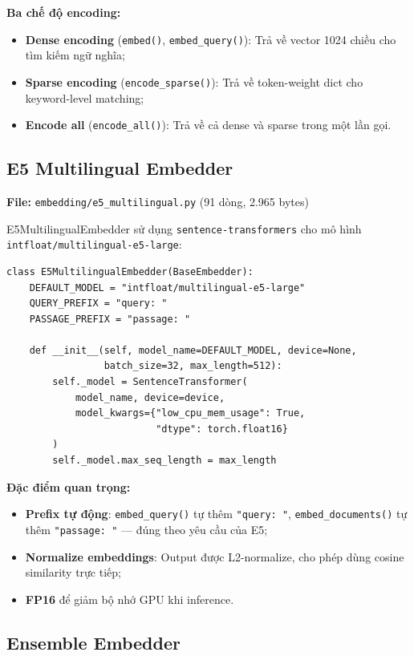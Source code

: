 \documentclass[../DoAn.tex]{subfiles}
\begin{document}
\textbf{Ba chế độ encoding:}
\begin{itemize}
    \item \textbf{Dense encoding} (\texttt{embed()}, \texttt{embed\_query()}): Trả về vector 1024 chiều cho tìm kiếm ngữ nghĩa;
    \item \textbf{Sparse encoding} (\texttt{encode\_sparse()}): Trả về token-weight dict cho keyword-level matching;
    \item \textbf{Encode all} (\texttt{encode\_all()}): Trả về cả dense và sparse trong một lần gọi.
\end{itemize}

\subsection{E5 Multilingual Embedder}
\textbf{File:} \texttt{embedding/e5\_multilingual.py} (91 dòng, 2.965 bytes)

E5MultilingualEmbedder sử dụng \texttt{sentence-transformers} cho mô hình \texttt{intfloat/multilingual-e5-large}:
\begin{verbatim}
class E5MultilingualEmbedder(BaseEmbedder):
    DEFAULT_MODEL = "intfloat/multilingual-e5-large"
    QUERY_PREFIX = "query: "
    PASSAGE_PREFIX = "passage: "

    def __init__(self, model_name=DEFAULT_MODEL, device=None,
                 batch_size=32, max_length=512):
        self._model = SentenceTransformer(
            model_name, device=device,
            model_kwargs={"low_cpu_mem_usage": True,
                          "dtype": torch.float16}
        )
        self._model.max_seq_length = max_length
\end{verbatim}

\textbf{Đặc điểm quan trọng:}
\begin{itemize}
    \item \textbf{Prefix tự động}: \texttt{embed\_query()} tự thêm \texttt{"query: "}, \texttt{embed\_documents()} tự thêm \texttt{"passage: "} — đúng theo yêu cầu của E5;
    \item \textbf{Normalize embeddings}: Output được L2-normalize, cho phép dùng cosine similarity trực tiếp;
    \item \textbf{FP16} để giảm bộ nhớ GPU khi inference.
\end{itemize}

\subsection{Ensemble Embedder}
\end{document}
